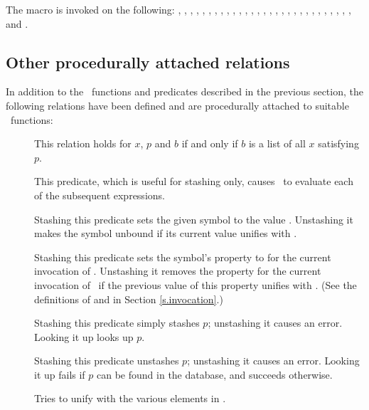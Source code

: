 The macro  is invoked on the following:
, , , , ,
, , , ,
, , , \type{+}, \type{*},
\type{-}, \type{/}, , , ,
, , , , ,
, , , , , 
and .

\subsection{Other procedurally attached relations}

In addition to the \lisp\ functions and predicates described in the
previous section, the following relations have been defined and
are procedurally attached to suitable \lisp\ functions:
 \begin{description}
 \item [] This relation holds for $x$,
$p$ and $b$ if and only if $b$ is a list of all $x$ satisfying $p$.
 \item [] This predicate, which is
useful for stashing only, causes \lisp\ to evaluate each of the subsequent
expressions.
 \item [] Stashing this predicate sets the
given symbol to the value .  Unstashing it makes the symbol
unbound if its current value unifies with .
 \item [] Stashing this
predicate sets the symbol's  property to 
for the current invocation of \mvl.  Unstashing it removes the
 property for the current invocation of \mvl\ if the
previous value of this property unifies with .  (See the
definitions of  and  in Section
\ref{s.invocation}.)
 \item []  Stashing this predicate simply stashes $p$;
unstashing it causes an error.  Looking it up looks up $p$.
 \item []  Stashing this predicate unstashes $p$;
unstashing it causes an error.  Looking it up fails if $p$
can be found in the database, and succeeds otherwise.
 \item [] Tries to unify  with
the various elements in .
 \end{description}

